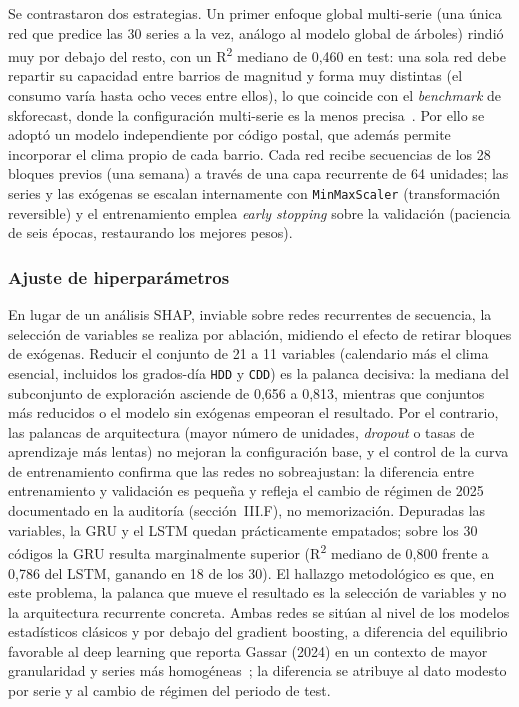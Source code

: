 \documentclass[12pt, a4paper]{article}
\begin{document}
Se contrastaron dos estrategias. Un primer enfoque global multi-serie (una única red que predice las 30 series a la vez, análogo al modelo global de árboles) rindió muy por debajo del resto, con un R\textsuperscript{2} mediano de 0,460 en test: una sola red debe repartir su capacidad entre barrios de magnitud y forma muy distintas (el consumo varía hasta ocho veces entre ellos), lo que coincide con el \textit{benchmark} de skforecast, donde la configuración multi-serie es la menos precisa~\cite{skforecast}. Por ello se adoptó un modelo independiente por código postal, que además permite incorporar el clima propio de cada barrio. Cada red recibe secuencias de los 28 bloques previos (una semana) a través de una capa recurrente de 64 unidades; las series y las exógenas se escalan internamente con \texttt{MinMaxScaler} (transformación reversible) y el entrenamiento emplea \textit{early stopping} sobre la validación (paciencia de seis épocas, restaurando los mejores pesos).

\subsubsection{Ajuste de hiperparámetros}

En lugar de un análisis SHAP, inviable sobre redes recurrentes de secuencia, la selección de variables se realiza por ablación, midiendo el efecto de retirar bloques de exógenas. Reducir el conjunto de 21 a 11 variables (calendario más el clima esencial, incluidos los grados-día \texttt{HDD} y \texttt{CDD}) es la palanca decisiva: la mediana del subconjunto de exploración asciende de 0,656 a 0,813, mientras que conjuntos más reducidos o el modelo sin exógenas empeoran el resultado. Por el contrario, las palancas de arquitectura (mayor número de unidades, \textit{dropout} o tasas de aprendizaje más lentas) no mejoran la configuración base, y el control de la curva de entrenamiento confirma que las redes no sobreajustan: la diferencia entre entrenamiento y validación es pequeña y refleja el cambio de régimen de 2025 documentado en la auditoría (sección~III.F), no memorización. Depuradas las variables, la GRU y el LSTM quedan prácticamente empatados; sobre los 30 códigos la GRU resulta marginalmente superior (R\textsuperscript{2} mediano de 0,800 frente a 0,786 del LSTM, ganando en 18 de los 30). El hallazgo metodológico es que, en este problema, la palanca que mueve el resultado es la selección de variables y no la arquitectura recurrente concreta. Ambas redes se sitúan al nivel de los modelos estadísticos clásicos y por debajo del gradient boosting, a diferencia del equilibrio favorable al deep learning que reporta Gassar (2024) en un contexto de mayor granularidad y series más homogéneas~\cite{gassar2024}; la diferencia se atribuye al dato modesto por serie y al cambio de régimen del periodo de test.
\end{document}
